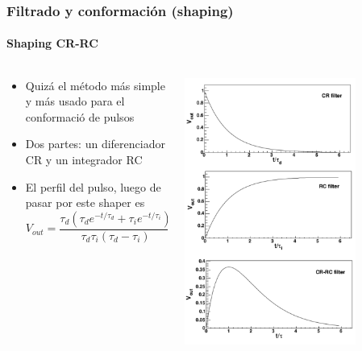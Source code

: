 \documentclass{beamer}
\begin{document}
\begin{frame}
\frametitle{Filtrado y conformación (shaping)}
\framesubtitle{{\color{blue}Shaping CR-RC}}
\begin{columns}
\begin{column}{0.5\textwidth}
\begin{itemize}
\item Quizá el método más simple y más usado para el conformació de pulsos
\item Dos partes: un diferenciador CR y un integrador RC
\item El perfil del pulso, luego de pasar por este shaper es
$$V_{out} = \frac{\tau_d(\tau_d e^{-t/\tau_d} + \tau_i e^{-t/\tau_i})}{\tau_d
\tau_i(\tau_d - \tau_i)}$$
\end{itemize}
\end{column}
\begin{column}{0.5\textwidth}
\begin{center}
\includegraphics[width=0.75\textwidth]{d2/cr_rc_shaping}
\end{center}
\end{column}
\end{columns}
\end{frame}
\end{document}
